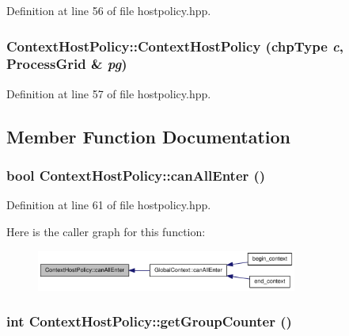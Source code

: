 Definition at line 56 of file hostpolicy.hpp.\hypertarget{class_context_host_policy_aadf1b0bd209574d0b3a6c17dbdfed5eb}{
\subsubsection[{ContextHostPolicy}]{\setlength{\rightskip}{0pt plus 5cm}ContextHostPolicy::ContextHostPolicy ({\bf chpType} {\em c}, \/  {\bf ProcessGrid} \& {\em pg})}}
\label{class_context_host_policy_aadf1b0bd209574d0b3a6c17dbdfed5eb}


Definition at line 57 of file hostpolicy.hpp.

\subsection{Member Function Documentation}
\hypertarget{class_context_host_policy_a78e3cff62d65667d5b4ea715b411a2c8}{
\subsubsection[{canAllEnter}]{\setlength{\rightskip}{0pt plus 5cm}bool ContextHostPolicy::canAllEnter ()}}
\label{class_context_host_policy_a78e3cff62d65667d5b4ea715b411a2c8}


Definition at line 61 of file hostpolicy.hpp.

Here is the caller graph for this function:\nopagebreak
\begin{figure}[H]
\begin{center}
\leavevmode
\includegraphics[width=243pt]{class_context_host_policy_a78e3cff62d65667d5b4ea715b411a2c8_icgraph}
\end{center}
\end{figure}
\hypertarget{class_context_host_policy_a4281d32782181a79b2000f28fbb1b771}{
\subsubsection[{getGroupCounter}]{\setlength{\rightskip}{0pt plus 5cm}int ContextHostPolicy::getGroupCounter ()}}
\label{class_context_host_policy_a4281d32782181a79b2000f28fbb1b771}


